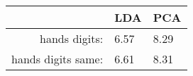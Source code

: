 \begin{tabular}{|r|l|l|}
  \hline
    & LDA & PCA \\
  \hline
  hands digits: & 6.57 & 8.29 \\
  \hline
  hands digits same: & 6.61 & 8.31 \\
  \hline
\end{tabular}
